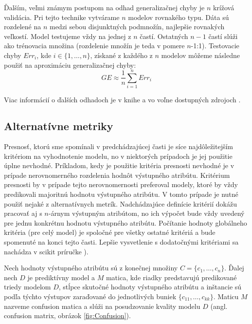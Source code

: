 Ďalším, veľmi známym postupom na odhad generalizačnej chyby je $n$ krížová validácia. Pri tejto technike vytvárame $n$ modelov rovnakého typu. Dáta sú rozdelené na $n$ medzi sebou disjunktných podmnožín, najlepšie rovnakých veľkostí. Model testujeme vždy na jednej z $n$ častí. Ostatných $n-1$ častí slúži ako trénovacia množina (rozdelenie množín je teda v pomere $n$-1:1). Testovacie chyby $Err_{i}$, kde $i \in \{1,\ldots,n\}$, získané z každého z $n$ modelov môžeme následne použiť na aproximáciu generalizačnej chyby:
\begin{equation}
GE \approx \dfrac{1}{n} \sum_{i=1}^{n} Err_{i}
\end{equation}

Viac informácií o ďalších odhadoch je v knihe \cite[s. 56]{kap1-DataMiningForTrees} a vo voľne dostupných zdrojoch \cite{wiki-CrossValidation,online-validation}.

\subsection{Alternatívne metriky}\label{kap1:2.6:2.6.2:Alternatives}
Presnosť, ktorú sme spomínali v predchádzajúcej časti je síce najdôležitejším kritériom na vyhodnotenie modelu, no v niektorých prípadoch je jej použitie úplne nevhodné. Príkladom, kedy je použitie kritéria presnosti nevhodné je v prípade nerovnomerného rozdelenia hodnôt výstupného atribútu. Kritérium presnosti by v prípade tejto nerovnomernosti preferoval modely, ktoré by vždy predikovali majoritnú hodnotu výstupného atribútu. V tomto prípade je nutné použiť nejaké z alternatívnych metrík.  
Nadchádzajúce definície kritérií dokážu pracovať aj s $n$-árnym výstupným atribútom, no ich výpočet bude vždy uvedený pre jednu konkrétnu hodnotu výstupného atribútu. Počítanie hodnoty globálneho kritéria (pre celý model) je spoločné pre všetky ostatné kritériá a bude spomenuté na konci tejto časti. Lepšie vysvetlenie s dodatočnými kritériami sa nachádza v scikit príručke \cite{online-NAryConfusion}).

\begin{def-sk}
Nech hodnoty výstupného atribútu sú z konečnej množiny $C = \{c_{1},\ldots,c_{n}\}$. Ďalej nech $D$ je prediktívny model a $M$ matica, kde riadky predstavujú predikované triedy modelom $D$, stĺpce skutočné hodnoty výstupného atribútu a inštancie sú podľa týchto výstupov zaraďované do jednotlivých buniek $\{c_{11},\ldots,c_{kk}\}$. Maticu $M$ nazveme confusion matica a slúži na posudzovanie kvality modelu $D$ (angl. confusion matrix, obrázok \ref{fig:Confusion}).
\end{def-sk}

